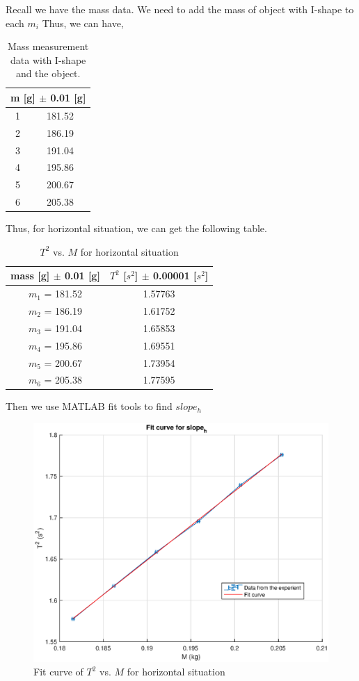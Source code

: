 Recall we have the mass data. 
We need to add the mass of object with I-shape to each $m_i$
Thus, we can have,

\begin{table}[H]
\centering
\begin{tabular}{|c|c|}
\hline
\multicolumn{2}{|c|}{m [g] $\pm$ 0.01 [g]} \\ \hline
1 & 181.52 \\ \hline
2 & 186.19 \\ \hline
3 & 191.04 \\ \hline
4 & 195.86 \\ \hline
5 & 200.67 \\ \hline
6 & 205.38 \\ \hline
\end{tabular}
\caption{Mass measurement data with I-shape and the object.}
\label{massofweight1}
\end{table}

Thus, for horizontal situation, we can get the following table.

\begin{table}[H]
	\centering
	\begin{tabular}{|c|c|}
	\hline
	mass [g] $\pm$ 0.01 [g] & $T^2$ [$s^2$] $\pm$ 0.00001 [$s^2$] \\ \hline
	$m_1$ = 181.52  & 1.57763 \\ \hline
	$m_2$ = 186.19  & 1.61752 \\ \hline
	$m_3$ = 191.04  & 1.65853 \\ \hline
	$m_4$ = 195.86  & 1.69551 \\ \hline
	$m_5$ = 200.67  & 1.73954 \\ \hline
	$m_6$ = 205.38  & 1.77595 \\ \hline
	\end{tabular}
	\caption{$T^2$ vs. $M$ for horizontal situation}
\label{T2vsM_0}
\end{table}

Then we use MATLAB fit tools to find $slope_{h}$

\begin{figure}[H]
	\centering
	\includegraphics[width=13cm]{matlab/fitfig/m1}
	\caption{Fit curve of $T^2$ vs. $M$ for horizontal situation}
\end{figure}

